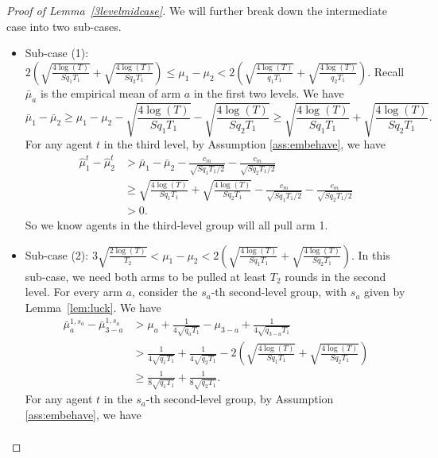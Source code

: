 \begin{proof}[Proof of Lemma~\ref{3levelmidcase}]
  We will further break down the intermediate case into two sub-cases.
\begin{itemize}

\item Sub-case (1):
  $2\left(\sqrt{\frac{4\log(T)}{Sq_1T_1}} +
    \sqrt{\frac{4\log(T)}{Sq_2T_1}}\right) \leq \mu_1-\mu_2 <
  2\left(\sqrt{\frac{4\log(T)}{q_1T_1}} +
    \sqrt{\frac{4\log(T)}{q_2T_1}}\right)$. Recall $\bar{\mu}_a$ is
  the empirical mean of arm $a$ in the first two levels. We have
\[
\bar{\mu}_1 - \bar{\mu}_2 \geq \mu_1 -\mu_2 - \sqrt{\frac{4\log(T)}{Sq_1T_1}} - \sqrt{\frac{4\log(T)}{Sq_2T_1}} \geq  \sqrt{\frac{4\log(T)}{Sq_1T_1}} 
+ \sqrt{\frac{4\log(T)}{Sq_2T_1}}.
\]
For any agent $t$ in the third level, by Assumption \ref{ass:embehave}, we have
\begin{align*}
\hat{\mu}_1^t - \hat{\mu}_2^t &>\bar{\mu}_1 - \bar{\mu}_2 - \frac{c_m}{\sqrt{Sq_1T_1/2}} - \frac{c_m}{\sqrt{Sq_2T_1/2}}\\
&\geq  \sqrt{\frac{4\log(T)}{Sq_1T_1}} + \sqrt{\frac{4\log(T)}{Sq_2T_1}}- \frac{c_m}{\sqrt{Sq_1T_1/2}} - \frac{c_m}{\sqrt{Sq_2T_1/2}}\\
 &> 0.
\end{align*}
So we know agents in the third-level group will all pull arm 1. 
\item Sub-case (2):
  $ 3\sqrt{\frac{2\log(T)}{T_2}} < \mu_1-\mu_2 <
  2\left(\sqrt{\frac{4\log(T)}{Sq_1T_1}} +
    \sqrt{\frac{4\log(T)}{Sq_2T_1}}\right)$.  In this sub-case, we
  need both arms to be pulled at least $T_2$ rounds in the second
  level. For every arm $a$, consider the $s_a$-th second-level group,
  with $s_a$ given by Lemma~\ref{lem:luck}. We have
\begin{align*}
\bar{\mu}_a^{1,s_a} - \bar{\mu}_{3-a}^{1,s_a} &> \mu_a + \frac{1}{4\sqrt{q_aT_1}} -\mu_{3-a} +\frac{1}{4\sqrt{q_{3-a}T_1}} \\
&> \frac{1}{4\sqrt{q_1T_1}}+ \frac{1}{4\sqrt{q_2T_1}} - 2\left(\sqrt{\frac{4\log(T)}{Sq_1T_1}} 
+ \sqrt{\frac{4\log(T)}{Sq_2T_1}}\right) \\
&\geq \frac{1}{8\sqrt{q_1T_1}}+ \frac{1}{8\sqrt{q_2T_1}}.
\end{align*}
For any agent $t$ in the $s_a$-th second-level group, by Assumption \ref{ass:embehave}, we have
\begin{align*}

\end{align*}
\end{itemize}
\end{proof}
